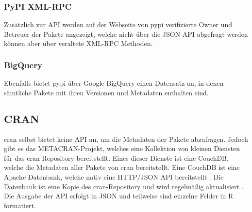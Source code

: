 \subsubsection*{PyPI XML-RPC}
\label{subsubsec:pypi_xml_rpc}
Zusätzlich zur API werden auf der Webseite von \gls{pypi} verifizierte Owner und Betreuer der Pakete angezeigt, welche nicht über die JSON API abgefragt werden können aber über veraltete XML-RPC Methoden.

\subsubsection*{BigQuery}
\label{subsubsec:pypi_bigquery}
Ebenfalls bietet \gls{pypi} über Google BigQuery einen Datensatz an, in denen sämtliche Pakete mit ihren Versionen und Metadaten enthalten sind.

\subsection{CRAN}
\label{subsec:paketverwaltung_cran}
\gls{cran} selbst bietet keine API an, um die Metadaten der Pakete abzufragen.
Jedoch gibt es das METACRAN-Projekt, welches eine Kollektion von kleinen Diensten für das \gls{cran}-Repository bereitstellt.
Eines dieser Dienste ist eine CouchDB, welche die Metadaten aller Pakete von \gls{cran} bereitstellt.
Eine CouchDB ist eine Apache Datenbank, welche nativ eine HTTP/JSON API bereitstellt \autocite{the_apache_software_foundation_apache_2024}.
Die Datenbank ist eine Kopie des \gls{cran}-Repository und wird regelmäßig aktualisiert \autocite{csardi_pkgsearch_2023}.
Die Ausgabe der API erfolgt in JSON und teilweise sind einzelne Felder in R formatiert.
